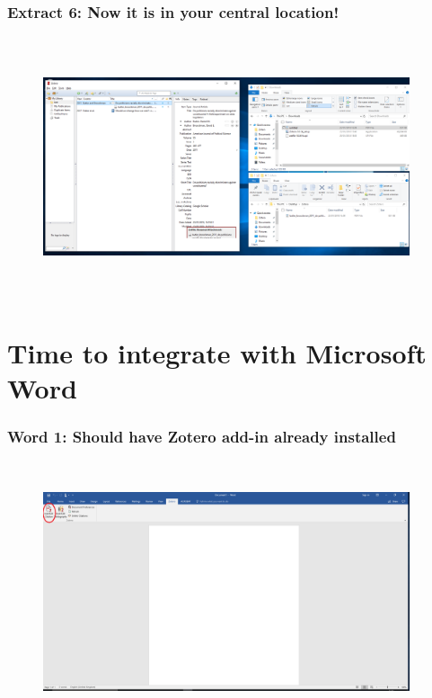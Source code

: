 \documentclass[12pt]{beamer}
\begin{document}
\begin{frame} \frametitle{Extract 6: Now it is in your central location!} \begin{figure}[!h] \centering
	\includegraphics[height=3in, width = 4.25in,keepaspectratio]{zotero/extract_6.png}
\end{figure} \end{frame}

\section{Time to integrate with Microsoft Word}

\begin{frame} \frametitle{Word 1: Should have Zotero add-in already installed} \begin{figure}[!h] \centering
	\includegraphics[height=3in, width = 4.25in,keepaspectratio]{zotero/word_1.png}
\end{figure} \end{frame}
\end{document}

